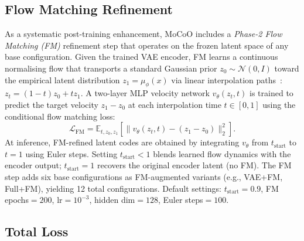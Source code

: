 \documentclass[journal]{IEEEtran}
\begin{document}
\subsection{Flow Matching Refinement}
\label{sec:method:fm}

As a systematic post-training enhancement, MoCoO includes a \emph{Phase-2 Flow Matching (FM)} refinement step that operates on the frozen latent space of any base configuration. Given the trained VAE encoder, FM learns a continuous normalising flow that transports a standard Gaussian prior $z_0 \sim \mathcal{N}(0, I)$ toward the empirical latent distribution $z_1 = \mu_\phi(x)$ via linear interpolation paths~\cite{lipman2023flow}: $z_t = (1 - t) z_0 + t z_1$. A two-layer MLP velocity network $v_\theta(z_t, t)$ is trained to predict the target velocity $z_1 - z_0$ at each interpolation time $t \in [0, 1]$ using the conditional flow matching loss:
\begin{equation}
    \mathcal{L}_{\mathrm{FM}} = \mathbb{E}_{t, z_0, z_1}\!\left[\| v_\theta(z_t, t) - (z_1 - z_0) \|_2^2\right].
    \label{eq:fm_loss}
\end{equation}
At inference, FM-refined latent codes are obtained by integrating $v_\theta$ from $t_{\mathrm{start}}$ to $t{=}1$ using Euler steps. Setting $t_{\mathrm{start}} < 1$ blends learned flow dynamics with the encoder output; $t_{\mathrm{start}} = 1$ recovers the original encoder latent (no FM). The FM step adds six base configurations as FM-augmented variants (e.g., VAE+FM, Full+FM), yielding 12 total configurations. Default settings: $t_{\mathrm{start}}{=}0.9$, FM epochs${=}200$, lr${=}10^{-3}$, hidden dim${=}128$, Euler steps${=}100$.

\subsection{Total Loss}
\label{sec:method:loss}
\end{document}
